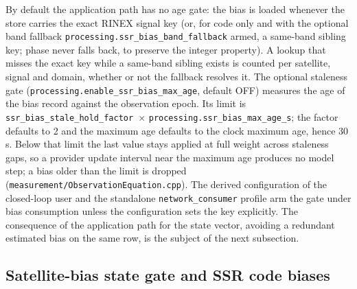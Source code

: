 \documentclass[main.tex]{subfiles}
\begin{document}
By default the application path has no age gate: the bias
is loaded whenever the store carries the exact RINEX signal key (or, for
code only and with the optional band fallback
\texttt{processing.ssr\_bias\_band\_fallback} armed, a same-band
sibling key; phase never falls back, to preserve the integer property). A
lookup that misses the exact key while a same-band sibling exists is counted
per satellite, signal and domain, whether or not the fallback resolves it.
The optional staleness gate (\texttt{processing.enable\_ssr\_bias\_max\_age},
default OFF) measures the age of the bias record against the observation
epoch. Its limit is \texttt{ssr\_bias\_stale\_hold\_factor}~$\times$
\texttt{processing.ssr\_bias\_max\_age\_s}; the factor defaults to 2 and the
maximum age defaults to the clock maximum age, hence $30$\,s. Below that limit the
last value stays applied at full weight across staleness gaps, so a
provider update interval near the maximum age produces no model step; a
bias older than the limit is dropped (\texttt{measurement/ObservationEquation.cpp}).
The derived configuration of the closed-loop user and the standalone
\texttt{network\_consumer} profile arm the gate under bias consumption unless the
configuration sets the key explicitly.
The consequence of the application path for the state vector, avoiding a
redundant estimated bias on the same row, is the subject of the next
subsection.

\subsection{Satellite-bias state gate and SSR code biases}\label{sec:ssr-satbias-gate}
\end{document}
